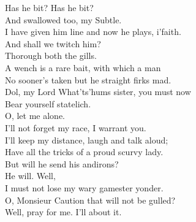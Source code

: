 \documentclass[a4paper,oneside,12pt]{memoir}
\begin{document}
\begin{drama*}
\subtlespeaks Has he bit? Has he bit?\\
\facespeaks {} And swallowed too, my Subtle.\\
I have given him line and now he plays, i'faith.\\
\subtlespeaks And shall we twitch him?\\
\facespeaks {} Thorough both the gills.\\
A wench is a rare bait, with which a man\\
No sooner's taken but he straight firks mad.\\
\subtlespeaks Dol, my Lord What'ts'hums sister, you must now\\
Bear yourself statelich.\\
\dolspeaks {} O, let me alone.\\
I'll not forget my race, I warrant you.\\
I'll keep my distance, laugh and talk aloud;\\
Have all the tricks of a proud scurvy lady.\\
\subtlespeaks But will he send his andirons?\\
\facespeaks {} He will. Well,\\
I must not lose my wary gamester yonder.\\
\subtlespeaks O, Monsieur Caution that will not be gulled?\\
\facespeaks Well, pray for me. I'll about it.\\

\scene


\end{drama*}
\end{document}
